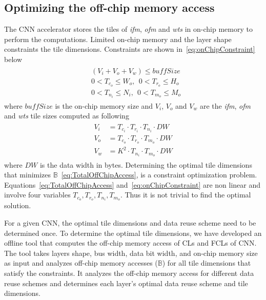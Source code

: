 \documentclass[a4paper,10pt]{article}
\newcommand{\numBytesOffChip}{\mathbb{B}}
\newcommand{\dataWidth}{DW}
\newcommand{\BuffSize}{buffSize}
\begin{document}
\subsection{Optimizing the off-chip memory access}
The CNN accelerator stores the tiles of \textit{ifm}, \textit{ofm} and \textit{wts} in on-chip memory to perform the computations. Limited on-chip memory and the layer shape constraints the tile dimensions. Constraints are shown in~\eqref{eq:onChipConstraint} below
\begin{align}\label{eq:onChipConstraint}
	\begin{split}
		&(V_{i}{+}V_{o}{+}V_{w})\leq \BuffSize \\
		&0<T_{c_o}\leq W_o,~\ 0<T_{r_o}\leq H_o\\
		&0<T_{n_i}\leq N_i,~\ 0<T_{m_o}\leq M_o
	\end{split}
\end{align}
where $\BuffSize$ is the on-chip memory size and $V_{i}$, $V_{o}$ and $V_{w}$ are the \textit{ifm}, \textit{ofm} and \textit{wts} tile sizes computed as following 
\begin{align}\label{eq:tilesVol}
	\begin{split}
		V_{i}&=T_{c_i}{\cdot} T_{r_i}{\cdot} T_{n_i}{\cdot}\dataWidth\\
		V_{o}&=T_{c_o}{\cdot} T_{r_o}{\cdot} T_{m_o}{\cdot}\dataWidth\\
		V_{w}&=K^2{\cdot} T_{n_i}{\cdot} T_{m_o}{\cdot}\dataWidth
	\end{split}
\end{align}
where $\dataWidth$ is the data width in bytes.
Determining the optimal tile dimensions that minimizes $\numBytesOffChip$~\eqref{eq:TotalOffChipAccess}, is a constraint optimization problem. Equations~\eqref{eq:TotalOffChipAccess} and~\eqref{eq:onChipConstraint} are non linear and involve four variables $T_{c_o},T_{r_o},T_{n_i},T_{m_o}$. Thus it is not trivial to find the optimal solution.

For a given CNN, the optimal tile dimensions and data reuse scheme need to be determined once. To determine the optimal tile dimensions, we have developed an offline tool that computes the off-chip memory access of CLs and FCLs of CNN. The tool takes layers shape, bus width, data bit width, and on-chip memory size as input and analyzes off-chip memory accesses ($\numBytesOffChip$) for all tile dimensions that satisfy the constraints. It analyzes the off-chip memory access for different data reuse schemes and determines each layer's optimal data reuse scheme and tile dimensions.
\end{document}
